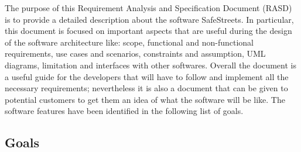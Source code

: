 The purpose of this Requirement Analysis and Specification Document (RASD)
is to provide a detailed description about the software SafeStreets.
In particular, this document is focused on important aspects that are
useful during the design of the software architecture like: scope, functional and
non-functional requirements, use cases and scenarios, constraints and assumption, UML diagrams, limitation and interfaces with other softwares.
Overall the document is a useful guide for the developers that will have to follow
and implement all the necessary requirements; nevertheless it is also a document
that can be given to potential customers to get them an idea of what the software
will be like.\newline
The software features have been identified in the following list of goals.

\subsection{Goals}
